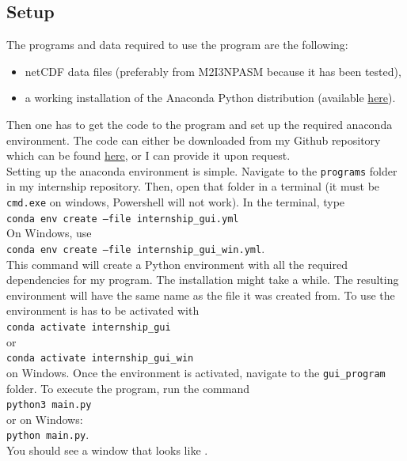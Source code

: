 \documentclass[../00_main.tex]{subfiles}
\begin{document}
\subsection{Setup}

The programs and data required to use the program are the following:
\begin{itemize}
    \item netCDF data files (preferably from M2I3NPASM because it has been
        tested),
    \item a working installation of the Anaconda Python distribution (available
        \href{https://www.anaconda.com/products/individual}{here}).
\end{itemize}
Then one has to get the code to the program and set up the required anaconda 
environment. The code can either be downloaded from my Github repository which
can be found \href{https://github.com/moritz-konarski/internship}{here}, or I 
can provide it upon request. \\
Setting up the anaconda environment is simple.
Navigate to the \texttt{programs} folder in my internship repository. Then,
open that folder in a terminal (it must be \texttt{cmd.exe} on windows,
Powershell will not work). In the terminal, type \\
\texttt{conda env create --file internship\_gui.yml} \\
\noindent
On Windows, use \\
\texttt{conda env create --file internship\_gui\_win.yml}. \\
\noindent
This command will create a Python
environment with all the required dependencies for my program. The installation
might take a while. The resulting environment
will have the same name as the file it was created from. To use the environment
is has to be activated with \\
\texttt{conda activate internship\_gui} \\
\noindent
or \\
\texttt{conda activate internship\_gui\_win} \\
\noindent
on Windows. Once the environment is
activated, navigate to the \texttt{gui\_program} folder. To execute the
program, run the command \\
\texttt{python3 main.py} \\
\noindent
or on Windows:\\
\texttt{python main.py}. \\
\noindent
You should see a window that looks like .
\end{document}
